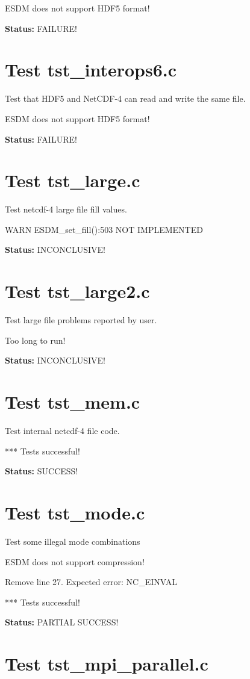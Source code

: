 ESDM does not support HDF5 format!

{\bf \large Status: } FAILURE!

\section{Test tst\_interops6.c}

Test that HDF5 and NetCDF-4 can read and write the same file.

ESDM does not support HDF5 format!

{\bf \large Status: } FAILURE!

\section{Test tst\_large.c}

Test netcdf-4 large file fill values.

WARN ESDM\_set\_fill():503 NOT IMPLEMENTED

{\bf \large Status: } INCONCLUSIVE!

\section{Test tst\_large2.c}

Test large file problems reported by user.

Too long to run!

{\bf \large Status: } INCONCLUSIVE!

\section{Test tst\_mem.c}

Test internal netcdf-4 file code.

*** Tests successful!

{\bf \large Status: } SUCCESS!

\section{Test tst\_mode.c}

Test some illegal mode combinations

ESDM does not support compression!

Remove line 27. Expected error: NC\_EINVAL

*** Tests successful!

{\bf \large Status: } PARTIAL SUCCESS!

\section{Test tst\_mpi\_parallel.c}

